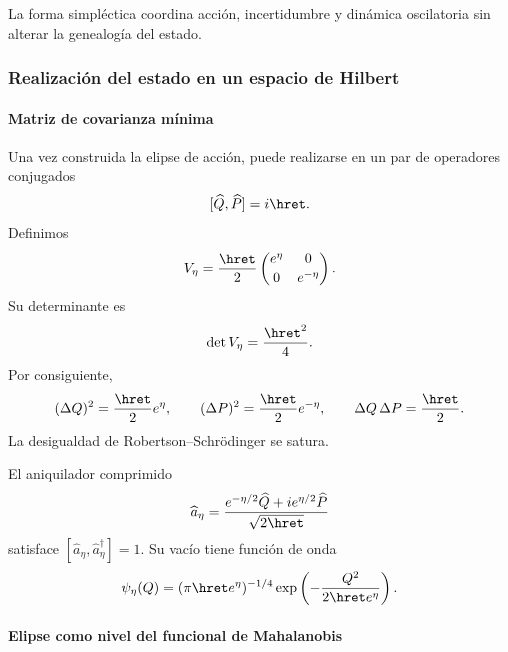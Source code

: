 \noindent La forma simpléctica coordina acción, incertidumbre y dinámica oscilatoria sin alterar la genealogía del estado.\par\medskip

\subsubsection{Realización del estado en un espacio de Hilbert}

\paragraph{Matriz de covarianza mínima}

Una vez construida la elipse de acción, puede realizarse en un par de
operadores conjugados
\[
[\widehat Q,\widehat P]=i\hret.
\]
Definimos
\begin{equation}
V_\eta=\frac{\hret}{2}
\begin{pmatrix}
e^\eta&0\\[2pt]0&e^{-\eta}
\end{pmatrix}.
\label{eq:covariance}
\end{equation}
Su determinante es
\begin{equation}
\det V_\eta=\frac{\hret^2}{4}.
\label{eq:cov-det}
\end{equation}
Por consiguiente,
\begin{equation}
(\Delta Q)^2=\frac{\hret}{2}e^\eta,
\qquad
(\Delta P)^2=\frac{\hret}{2}e^{-\eta},
\qquad
\Delta Q\,\Delta P=\frac{\hret}{2}.
\label{eq:uncertainty}
\end{equation}
La desigualdad de Robertson--Schrödinger se satura.

El aniquilador comprimido
\begin{equation}
\widehat a_\eta=
\frac{e^{-\eta/2}\widehat Q+i e^{\eta/2}\widehat P}
{\sqrt{2\hret}}
\label{eq:a-eta}
\end{equation}
satisface \([\widehat a_\eta,\widehat a_\eta^\dagger]=1\). Su vacío tiene
función de onda
\begin{equation}
\psi_\eta(Q)=
(\pi\hret e^\eta)^{-1/4}
\exp\left(-\frac{Q^2}{2\hret e^\eta}\right).
\label{eq:gaussian}
\end{equation}

\paragraph{Elipse como nivel del funcional de Mahalanobis}

